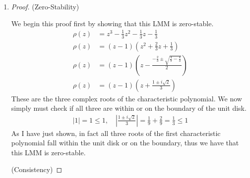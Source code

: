 \documentclass{article}
\begin{document}
\begin{enumerate}[label=\alph*)]

    \item 
    \begin{proof}
        (Zero-Stability)

        We begin this proof first by showing that this LMM is zero-stable. 
        \begin{align*}
            \rho(z) &= z^3 - \frac{1}{3}z^2 - \frac{1}{3}z - \frac{1}{3}\\
            \rho(z) &= (z-1)\left(z^2 + \frac{2}{3}z + \frac{1}{3}\right)\\
            \rho(z) &= (z-1)\left(z - \frac{-\frac{2}{3} \pm \sqrt{\frac{4}{9} -
            \frac{4}{3}}}{2}\right)\\
            \rho(z) &= (z-1)\left(z + \frac{1 \pm i\sqrt{2}}{3}\right)
        \end{align*}
        These are the three complex roots of the characteristic polynomial. We
        now simply must check if all three are within or on the boundary of the
        unit disk. 
        \begin{align*}
            |1| = 1 \le 1, \quad \left|\frac{1 \pm i\sqrt{2}}{3}\right| =
            \frac{1}{9} + \frac{2}{9} = \frac{1}{3} \le 1
        \end{align*}
        As I have just shown, in fact all three roots of the first
        characteristic polynomial fall within the unit disk or on the boundary,
        thus we have that this LMM is zero-stable. 

        (Consistency) 


\end{proof}
\end{enumerate}
\end{document}
